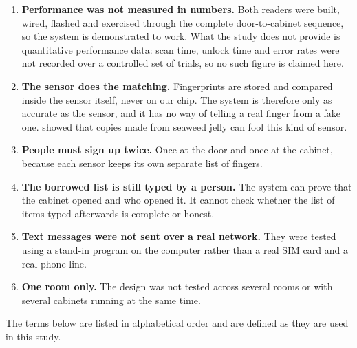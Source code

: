 \begin{enumerate}
  \item \textbf{Performance was not measured in numbers.} Both readers were
        built, wired, flashed and exercised through the complete door-to-cabinet
        sequence, so the system is demonstrated to work. What the study does not
        provide is quantitative performance data: scan time, unlock time and
        error rates were not recorded over a controlled set of trials, so no
        such figure is claimed here.
  \item \textbf{The sensor does the matching.} Fingerprints are stored and
        compared inside the sensor itself, never on our chip. The system is
        therefore only as accurate as the sensor, and it has no way of telling a
        real finger from a fake one. \textcite{rad2024} showed that copies made
        from seaweed jelly can fool this kind of sensor.
  \item \textbf{People must sign up twice.} Once at the door and once at the
        cabinet, because each sensor keeps its own separate list of fingers.
  \item \textbf{The borrowed list is still typed by a person.} The system can
        prove that the cabinet opened and who opened it. It cannot check whether
        the list of items typed afterwards is complete or honest.
  \item \textbf{Text messages were not sent over a real network.} They were
        tested using a stand-in program on the computer rather than a real SIM
        card and a real phone line.
  \item \textbf{One room only.} The design was not tested across several rooms
        or with several cabinets running at the same time.
\end{enumerate}


The terms below are listed in alphabetical order and are defined as they are
used in this study.

